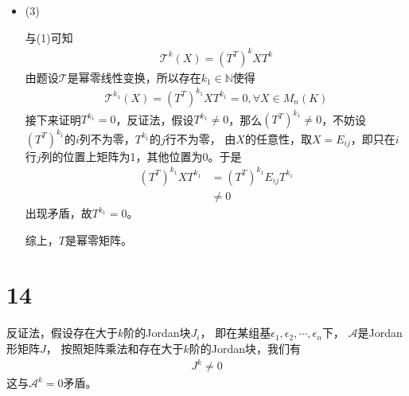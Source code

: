\documentclass{article}
\begin{document}
\begin{itemize}
        可选
        \begin{align*}
          X_0               & = \begin{bmatrix}
                                  1 & 0 \\
                                  0 & 1
                                \end{bmatrix} \\
          \mathscr{T} (X_0) & =
          \begin{bmatrix}
            0 & 0 \\
            1 & 0
          \end{bmatrix}
          \begin{bmatrix}
            1 & 0 \\
            0 & 1
          \end{bmatrix}
          \begin{bmatrix}
            0 & 1 \\
            0 & 0
          \end{bmatrix}
          = \begin{bmatrix}
              0 & 0 \\
              0 & 1
            \end{bmatrix}
        \end{align*}
        $X_0 \neq 0$，且$\mathscr{T}(X_0) \neq 0$，以$\mathscr{T}(X_0), X_0$作为一组基，
        $\mathscr{T}$在此组基下的矩阵为
        \begin{align*}
          \begin{bmatrix}
            0 & 1 \\
            0 & 0
          \end{bmatrix}
        \end{align*}
  \item (3)

        与(1)可知
        \begin{align*}
          \mathscr{T}^k(X) = (T^T)^k X T^k
        \end{align*}
        由题设$\mathscr{T}$是幂零线性变换，所以存在$k_1 \in \mathbb{N}$使得
        \begin{align*}
          \mathscr{T}^{k_1}(X) = (T^T)^{k_1} X T^{k_1} = 0, \forall X \in M_n(K)
        \end{align*}
        接下来证明$T^{k_1} = 0$，反证法，假设$T^{k_1} \neq 0$，那么$(T^T)^{k_1} \neq 0$，不妨设
        $(T^T)^{k_1}$的$i$列不为零，$T^{k_1}$的$j$行不为零，
        由$X$的任意性，取$X = E_{ij}$，即只在$i$行$j$列的位置上矩阵为1，其他位置为0。于是
        \begin{align*}
          (T^T)^{k_1} X T^{k_1} 
          & = (T^T)^{k_1} E_{ij} T^{k_1} \\
          & \neq 0
        \end{align*}
        出现矛盾，故$T^{k_1} = 0$。

        综上，$T$是幂零矩阵。
\end{itemize}

\section*{14}

反证法，假设存在大于$k$阶的Jordan块$J_i$，
即在某组基$\epsilon_1, \epsilon_2, \cdots, \epsilon_n$下，
$\mathscr{A}$是Jordan形矩阵$J$，
按照矩阵乘法和存在大于$k$阶的Jordan块，我们有
\begin{align*}
  J^k \neq 0
\end{align*}
这与$\mathscr{A}^k = 0$矛盾。
\end{document}
